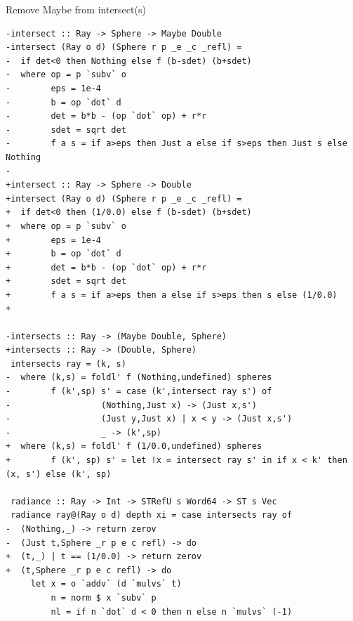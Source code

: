 \documentclass[8pt]{beamer}
\begin{document}
\begin{frame}[fragile]{Remove Maybe from intersect(s)}
\begin{verbatim}
-intersect :: Ray -> Sphere -> Maybe Double
-intersect (Ray o d) (Sphere r p _e _c _refl) =
-  if det<0 then Nothing else f (b-sdet) (b+sdet)
-  where op = p `subv` o
-        eps = 1e-4
-        b = op `dot` d
-        det = b*b - (op `dot` op) + r*r
-        sdet = sqrt det
-        f a s = if a>eps then Just a else if s>eps then Just s else Nothing
-
+intersect :: Ray -> Sphere -> Double
+intersect (Ray o d) (Sphere r p _e _c _refl) =
+  if det<0 then (1/0.0) else f (b-sdet) (b+sdet)
+  where op = p `subv` o
+        eps = 1e-4
+        b = op `dot` d
+        det = b*b - (op `dot` op) + r*r
+        sdet = sqrt det
+        f a s = if a>eps then a else if s>eps then s else (1/0.0)
+

-intersects :: Ray -> (Maybe Double, Sphere)
+intersects :: Ray -> (Double, Sphere)
 intersects ray = (k, s)
-  where (k,s) = foldl' f (Nothing,undefined) spheres
-        f (k',sp) s' = case (k',intersect ray s') of
-                  (Nothing,Just x) -> (Just x,s')
-                  (Just y,Just x) | x < y -> (Just x,s')
-                  _ -> (k',sp)
+  where (k,s) = foldl' f (1/0.0,undefined) spheres
+        f (k', sp) s' = let !x = intersect ray s' in if x < k' then (x, s') else (k', sp)
 
 radiance :: Ray -> Int -> STRefU s Word64 -> ST s Vec
 radiance ray@(Ray o d) depth xi = case intersects ray of
-  (Nothing,_) -> return zerov
-  (Just t,Sphere _r p e c refl) -> do
+  (t,_) | t == (1/0.0) -> return zerov
+  (t,Sphere _r p e c refl) -> do
     let x = o `addv` (d `mulvs` t)
         n = norm $ x `subv` p
         nl = if n `dot` d < 0 then n else n `mulvs` (-1)
\end{verbatim}
\end{frame}
\end{document}

